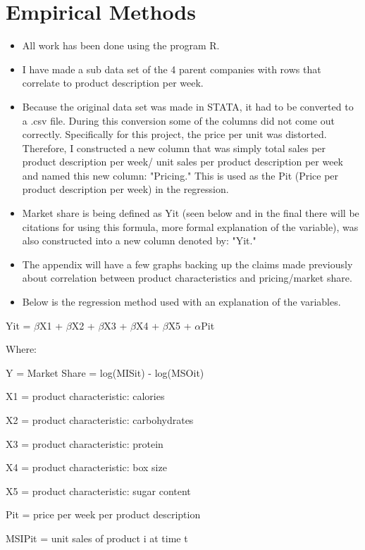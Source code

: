 \documentclass[12pt,english]{article}
\begin{document}
\section{Empirical Methods}

\begin{itemize}
    \item All work has been done using the program R.
    \item I have made a sub data set of the 4 parent companies with rows that correlate to product description per week. 
    \item Because the original data set was made in STATA, it had to be converted to a .csv file. During this conversion some of the columns did not come out correctly. Specifically for this project, the price per unit was distorted. Therefore, I constructed a new column that was simply total sales per product description per week/ unit sales per product description per week and named this new column: "Pricing."
    This is used as the Pit (Price per product description per week) in the regression.
    \item Market share is being defined as Yit (seen below and in the final there will be citations for using this formula, more formal explanation of the variable), was also constructed into a new column denoted by: "Yit."
    \item The appendix will have a few graphs backing up the claims made previously about correlation between product characteristics and pricing/market share. 
    \item Below is the regression method used with an explanation of the variables.
\end{itemize}


Yit = $\beta$X1 + $\beta$X2 + $\beta$X3 + $\beta$X4 + $\beta$X5 + $\alpha$Pit


Where:

      Y = Market Share = log(MISit) - log(MSOit)

      X1 = product characteristic: calories

      X2 = product characteristic: carbohydrates

      X3 = product characteristic: protein

      X4 = product characteristic: box size

      X5 = product characteristic: sugar content

      Pit = price per week per product description

      MSIPit = unit sales of product i at time t
\end{document}
